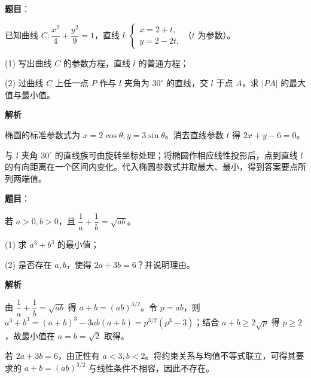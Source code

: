 \begin{answer}

\textbf{题目}：

已知曲线 $C:\dfrac{x^2}{4}+\dfrac{y^2}{9}=1$，直线 $l:\begin{cases}x=2+t,\\y=2-2t,\end{cases}$（$t$ 为参数）。

(1) 写出曲线 $C$ 的参数方程，直线 $l$ 的普通方程；

(2) 过曲线 $C$ 上任一点 $P$ 作与 $l$ 夹角为 $30^\circ$ 的直线，交 $l$ 于点 $A$，求 $|PA|$ 的最大值与最小值。

\textbf{解析}


椭圆的标准参数式为 $x=2\cos\theta,y=3\sin\theta$。消去直线参数 $t$ 得 $2x+y-6=0$。


与 $l$ 夹角 $30^\circ$ 的直线族可由旋转坐标处理；将椭圆作相应线性投影后，点到直线 $l$ 的有向距离在一个区间内变化。代入椭圆参数式并取最大、最小，得到答案要点所列两端值。

\gkanswer{答案（1）：$\begin{cases}x=2\cos\theta,\\y=3\sin\theta,\end{cases}\ (\theta\in[0,2\pi))$；$2x+y-6=0$。}


\end{answer}
\begin{answer}

\textbf{题目}：

若 $a>0,b>0$，且 $\dfrac1a+\dfrac1b=\sqrt{ab}$。

(1) 求 $a^3+b^3$ 的最小值；

(2) 是否存在 $a,b$，使得 $2a+3b=6$？并说明理由。

\textbf{解析}


由 $\dfrac1a+\dfrac1b=\sqrt{ab}$ 得 $a+b=(ab)^{3/2}$。令 $p=ab$，则 $a^3+b^3=(a+b)^3-3ab(a+b)=p^{3/2}(p^3-3)$；结合 $a+b\geqslant2\sqrt p$ 得 $p\geqslant2$，故最小值在 $a=b=\sqrt2$ 取得。


若 $2a+3b=6$，由正性有 $a<3,b<2$。将约束关系与均值不等式联立，可得其要求的 $a+b=(ab)^{3/2}$ 与线性条件不相容，因此不存在。



\end{answer}